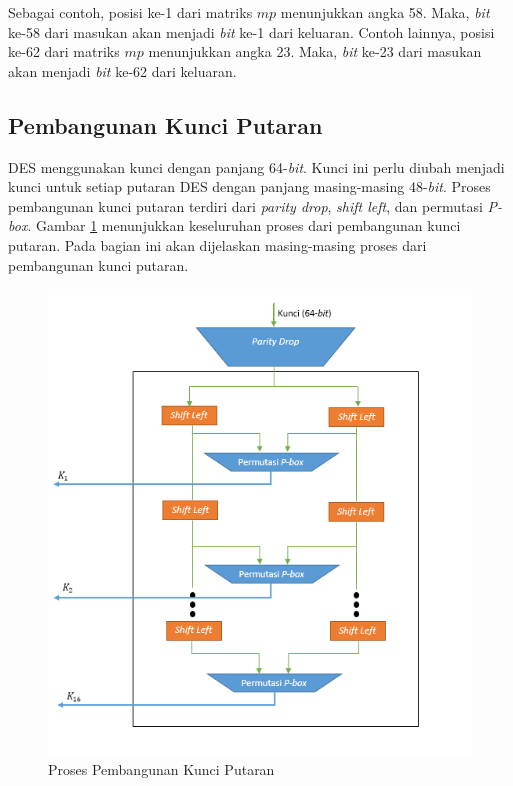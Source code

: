 Sebagai contoh, posisi ke-1 dari matriks \begin{math}mp\end{math} menunjukkan angka 58. Maka, \textit{bit} ke-58 dari masukan akan menjadi \textit{bit} ke-1 dari keluaran. Contoh lainnya, posisi ke-62 dari matriks $mp$ menunjukkan angka 23. Maka, \textit{bit} ke-23 dari masukan akan menjadi \textit{bit} ke-62 dari keluaran.

\subsection{Pembangunan Kunci Putaran}

DES menggunakan kunci dengan panjang 64-\textit{bit}. Kunci ini perlu diubah menjadi kunci untuk setiap putaran DES dengan panjang masing-masing 48-\textit{bit}. Proses pembangunan kunci putaran terdiri dari \textit{parity drop}, \textit{shift left}, dan permutasi \textit{P-box}. Gambar \ref{fig:keygenerate} menunjukkan keseluruhan proses dari pembangunan kunci putaran. Pada bagian ini akan dijelaskan masing-masing proses dari pembangunan kunci putaran.

\begin{figure}[h]
	\includegraphics[scale=0.7]{Gambar/key_generate}
	\centering
	\caption{Proses Pembangunan Kunci Putaran}\label{fig:keygenerate}
\end{figure}

